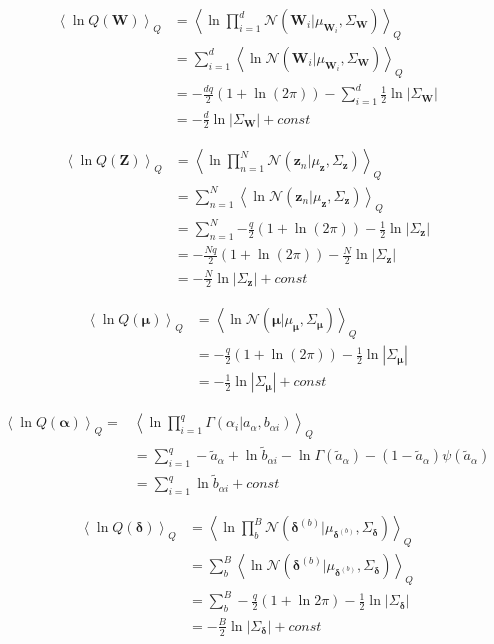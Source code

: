 \documentclass[10pt]{article}
\newcommand{\Angle}[1]{\left \langle #1 \right \rangle}
\newcommand{\Eq}[1]{\Angle{#1}_Q}
\newcommand{\N}[2][]{\mathcal{N} \left( #1,#2 \right)}
\newcommand{\Det}[1]{\left| #1 \right|}
\begin{document}
    \begin{align}
        \Eq{\ln{Q(\bm{W})}}&=\Eq{\ln{\prod_{i=1}^d{\N[\bm{W}_i | \mu_{\bm{W}_i}]{\Sigma_{\bm{W}}}}}} \nonumber\\
        &=\sum_{i=1}^d{\Eq{\ln{\N[{\bm{W}_i} | \mu_{\bm{W}_i}]{\Sigma_{\bm{W}}}}}} \nonumber \\
        &=-\frac{dq}{2}(1+\ln(2\pi)) - \sum_{i=1}^d{\frac{1}{2}\ln{\Det{\Sigma_{\bm{W}}}}}  \nonumber \\
        &=-\frac{d}{2}\ln{\Det{\Sigma_{\bm{W}}}} + const
        \label{qw}
    \end{align}

    \begin{align}
        \Eq{\ln{Q(\bm{Z})}}&=\Eq{\ln{\prod_{n=1}^N{\N[\bm{z}_n | \mu_{\bm{z}}]{\Sigma_{\bm{z}}}}}} \nonumber \\
        &=\sum_{n=1}^N{\Eq{\ln{\N[\bm{z}_n \vert \mu_{\bm{z}}]{\Sigma_{\bm{z}}}}}} \nonumber \\
        &=\sum_{n=1}^N{-\frac{q}{2}(1+\ln(2\pi)) - \frac{1}{2}\ln{\Det{\Sigma_{\bm{z}}}}} \nonumber \\
        &=-\frac{Nq}{2}( 1+\ln(2\pi)) - \frac{N}{2}\ln{\Det{\Sigma_{\bm{z}}}} \nonumber \\
        &=-\frac{N}{2}\ln{\Det{\Sigma_{\bm{z}}}} + const
        \label{qz}
    \end{align}

    \begin{align}
        \Eq{\ln{Q(\bm{\mu})}}&=\Eq{\ln{\N[\bm{\mu} | \mu_{\bm{\mu}}]{\Sigma_{\bm{\mu}}}}} \nonumber \\
        &=-\frac{q}{2}( 1+\ln(2\pi)) - \frac{1}{2}\ln{\Det{\Sigma_{\bm{\mu}}}} \nonumber \\
        &=-\frac{1}{2}\ln{\Det{\Sigma_{\bm{\mu}}}} + const
        \label{qmu}
    \end{align}

    \begin{align}
        \Eq{\ln{Q(\bm{\alpha})}}=&\Eq{\ln{\prod_{i=1}^q \Gamma(\alpha_i \vert a_\alpha,b_{\alpha i})}} \\
        &=\sum_{i=1}^q -\tilde{a}_\alpha+\ln{\tilde{b}_{\alpha i}}-\ln{\Gamma(\tilde{a}_\alpha)}-(1-\tilde{a}_\alpha)\psi(\tilde{a}_\alpha) \\
        &=\sum_{i=1}^q \ln{\tilde{b}_{\alpha i}} + const
        \label{qalpha}
    \end{align}

    \begin{align}
        \Eq{\ln{Q(\bm{\delta})}}&= \Eq{\ln{\prod_b^B\mathcal{N}(\bm{\delta}^{(b)}|\mu_{\bm{\delta}^{(b)}}, \Sigma_{\bm{\delta}})}} \nonumber \\
        &=\sum_b^B\Eq{\ln{\mathcal{N}(\bm{\delta}^{(b)}|\mu_{\bm{\delta}^{(b)}},\Sigma_{\bm{\delta}})}} \nonumber \\
        &= \sum_b^B-\frac{q}{2}(1 + \ln{2\pi}) - \frac{1}{2}\ln{|\Sigma_{\bm{\delta}}|}\nonumber \\
        &= -\frac{B}{2}\ln{|\Sigma_{\bm{\delta}}|} + const
        \label{qdelta}
    \end{align}
\end{document}
